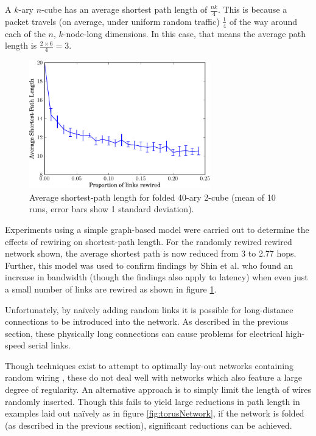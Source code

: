 			A $k$-ary $n$-cube has an average shortest path length of $\frac{nk}{4}$.
			This is because a packet travels (on average, under uniform random
			traffic) $\frac{1}{4}$ of the way around each of the $n$, $k$-node-long
			dimensions. In this case, that means the average path length is $\frac{2
			\times 6}{4} = 3$.
			
			\begin{figure}
				\center
				\includegraphics[width=0.7\textwidth]{figures/smallWorldTorus}
				\caption[Average shortest-path length for folded 40-ary 2-cube.]{Average
				shortest-path length for folded 40-ary 2-cube (mean of 10 runs, error
				bars show 1 standard deviation).}
				\label{fig:smallWorldTorus}
			\end{figure}
			
			Experiments using a simple graph-based model were carried out to determine
			the effects of rewiring on shortest-path length.  For the randomly rewired
			rewired network shown, the average shortest path is now reduced from 3 to
			2.77 hops.  Further, this model was used to confirm findings by Shin et
			al.  \cite{shin11} who found an increase in bandwidth (though the findings
			also apply to latency) when even just a small number of links are rewired
			as shown in figure \ref{fig:smallWorldTorus}.
			
			Unfortunately, by na\"ively adding random links it is possible for
			long-distance connections to be introduced into the network. As described
			in the previous section, these physically long connections can cause
			problems for electrical high-speed serial links.
			
			Though techniques exist to attempt to optimally lay-out networks
			containing random wiring \cite{koibuchi13}, these do not deal well with
			networks which also feature a large degree of regularity. An alternative
			approach is to simply limit the length of wires randomly inserted.
			Though this fails to yield large reductions in path length in examples
			laid out na\"ively as in figure \ref{fig:torusNetwork}, if the network is
			folded (as described in the previous section), significant reductions can
			be achieved.
			

